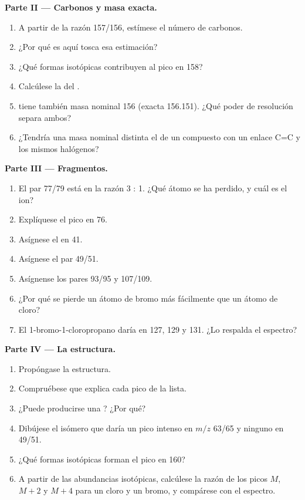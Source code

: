 \begin{problem}
\medskip
\noindent\textbf{Parte II --- Carbonos y masa exacta.}
\begin{enumerate}[resume]
  \item A partir de la razón 157/156, estímese el número de carbonos.
  \item ¿Por qué es aquí tosca esa estimación?
  \item ¿Qué formas isotópicas contribuyen al pico en 158?
  \item Calcúlese la  del .
  \item {} tiene también masa nominal 156 (exacta 156.151). ¿Qué poder de resolución separa
        ambos?
  \item ¿Tendría una masa nominal distinta el  de un compuesto con un enlace C=C y los mismos halógenos?
\end{enumerate}

\medskip
\noindent\textbf{Parte III --- Fragmentos.}
\begin{enumerate}[resume]
  \item El par 77/79 está en la razón 3 : 1. ¿Qué átomo se ha perdido, y cuál es el ion?
  \item Explíquese el pico en 76.
  \item Asígnese el  en 41.
  \item Asígnese el par 49/51.
  \item Asígnense los pares 93/95 y 107/109.
  \item ¿Por qué se pierde un átomo de bromo más fácilmente que un átomo de cloro?
  \item El 1-bromo-1-cloropropano daría  en 127, 129 y 131. ¿Lo respalda el
        espectro?
\end{enumerate}

\medskip
\noindent\textbf{Parte IV --- La estructura.}
\begin{enumerate}[resume]
  \item Propóngase la estructura.
  \item Compruébese que explica cada pico de la lista.
  \item ¿Puede producirse una ? ¿Por qué?
  \item Dibújese el isómero que daría un pico intenso en $m/z$ 63/65 y ninguno en 49/51.
  \item ¿Qué formas isotópicas forman el pico en 160?
  \item A partir de las abundancias isotópicas, calcúlese la razón de los picos $M$, $M+2$ y $M+4$ para un
        cloro y un bromo, y compárese con el espectro.
\end{enumerate}
\end{problem}
